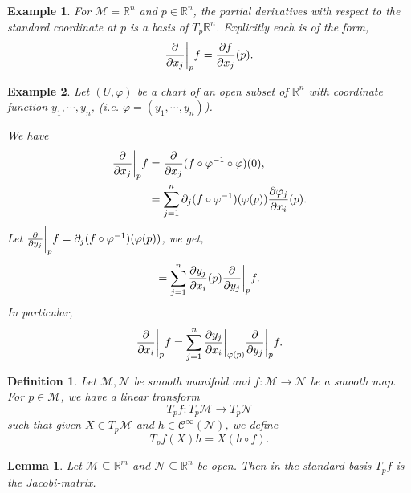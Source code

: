 \documentclass[10pt]{article}
\newtheorem{definition}{Definition}[section]
\newtheorem{lemma}{Lemma}[section]
\newtheorem{example}{Example}[section]
\newcommand{\R}[0]{\mathbb{R}}
\newcommand{\M}[0]{\mathcal{M}}
\newcommand{\cinf}[0]{\mathcal{C}^\infty}
\newcommand{\pd}[2]{{\frac {\partial #1} {\partial #2}}}
\begin{document}
\begin{example}
  For $\M = \R^n$ and $p\in\R^n$, the partial derivatives with respect to the standard coordinate at $p$ is a basis of $T_p\R^n$. Explicitly each is of the form,
  \begin{equation*}
    {\frac {\partial } {\partial x_j}}\bigg{|}_pf = {\frac {\partial f} {\partial x_j}}(p).
  \end{equation*}
\end{example}
\begin{example}
  \label{example_jacobian}
  Let $(U,\varphi)$ be a chart of an open subset of $\R^n$ with coordinate function $y_1,\cdots, y_n$, (i.e. $\varphi=(y_1,\cdots,y_n)$).
  \par We have 
  \begin{align*}
    \pd{}{x_j}\bigg{|}_pf &= \pd{}{x_j}(f\circ\varphi^{-1}\circ\varphi)(0),\\
    & = \sum_{j=1}^n\partial_j(f\circ\varphi^{-1})(\varphi(p))\pd{\varphi_j}{x_i}(p).
  \end{align*}
  Let $\pd{}{y_j}\bigg{|}_pf = \partial_j(f\circ\varphi^{-1})(\varphi(p))$, we get,
  \begin{equation*}
    =\sum_{j=1}^n \pd{y_j}{x_i}(p)\pd{}{y_j}\bigg{|}_pf.
  \end{equation*}
  In particular,
  \begin{equation*}
  \pd{}{x_i}\bigg{|}_pf  =\sum_{j=1}^n \pd{y_j}{x_i}\bigg{|}_{\varphi(p)}\pd{}{y_j}\bigg{|}_pf.
  \end{equation*}
\end{example}
\begin{definition}
  Let $\M,\mathcal{N}$ be smooth manifold and $f:\M\to\mathcal{N}$ be a smooth map. For $p\in\M$, we have a linear transform
  \begin{equation*}
    T_pf:T_p\M\to T_p\mathcal{N}
  \end{equation*}
  such that given $X\in T_p\M$ and $h\in\cinf(\mathcal{N})$, we define 
  \begin{equation*}
    T_pf(X)h = X(h\circ f).
  \end{equation*}
  \label{induced_linear_transform_tangent_space}
\end{definition}

\begin{lemma}
  \label{lemma_jacobian}
  Let $\M\subseteq\R^m$ and $\mathcal{N}\subseteq\R^n$ be open. Then in the standard basis $T_pf$ is the Jacobi-matrix.
\end{lemma}
\end{document}
